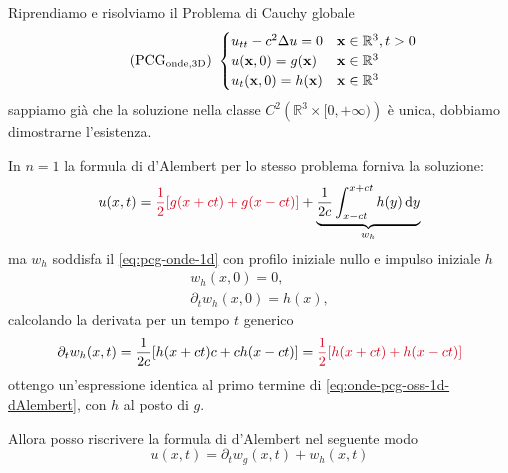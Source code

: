 Riprendiamo e risolviamo il Problema di Cauchy globale
\begin{equation*}
    \tag{PCG$_{\text{onde,3D}}$} \
    \begin{cases}
        u_{tt} -c^{2} \Delta u=0 & \x \in \mathbb{R}^{3} ,t >0 \\
        u(\x ,0) =g(\x)          & \x\in\mathbb{R}^{3}         \\
        u_{t}(\x ,0) =h(\x)      & \x\in\mathbb{R}^{3}
    \end{cases}
\end{equation*}
sappiamo già che la soluzione nella classe $C^{2}\left(\mathbb{R}^{3} \times [ 0,+\infty)\right)$ è unica, dobbiamo dimostrarne l'esistenza.
\begin{oss}
    In $n=1$ la formula di d'Alembert per lo stesso problema forniva la soluzione:
    \begin{equation}
        u(x,t) =\textcolor[rgb]{0.82,0.01,0.11}{\frac{1}{2}[g(x+ct)+g(x-ct)]} +\underbrace{\frac{1}{2c}\int _{x-ct}^{x+ct} h(y) \dy}_{w_{h}}
        \label{eq:onde-pcg-oss-1d-dAlembert}
    \end{equation}
    ma $\displaystyle w_{h}$ soddisfa il \eqref{eq:pcg-onde-1d} con profilo iniziale nullo e impulso iniziale $h$
    \begin{gather*}
        w_{h}(x,0) =0,\\
        \partial _{t} w_{h}(x,0) =h(x) ,
    \end{gather*}
    calcolando la derivata per un tempo $t$ generico
    \begin{equation*}
        \partial _{t} w_{h}(x,t) =\frac{1}{2c}[ h(x+ct) c+ch(x-ct)] =\textcolor[rgb]{0.82,0.01,0.11}{\frac{1}{2}[h(x+ct)+h(x-ct)]}
    \end{equation*}
    ottengo un'espressione identica al primo termine di \eqref{eq:onde-pcg-oss-1d-dAlembert}, con $h$ al posto di $g$.

    Allora posso riscrivere la formula di d'Alembert nel seguente modo
    \begin{equation*}
        u(x,t) =\partial _{t} w_{g}(x,t) +w_{h}(x,t)
    \end{equation*}
\end{oss}

